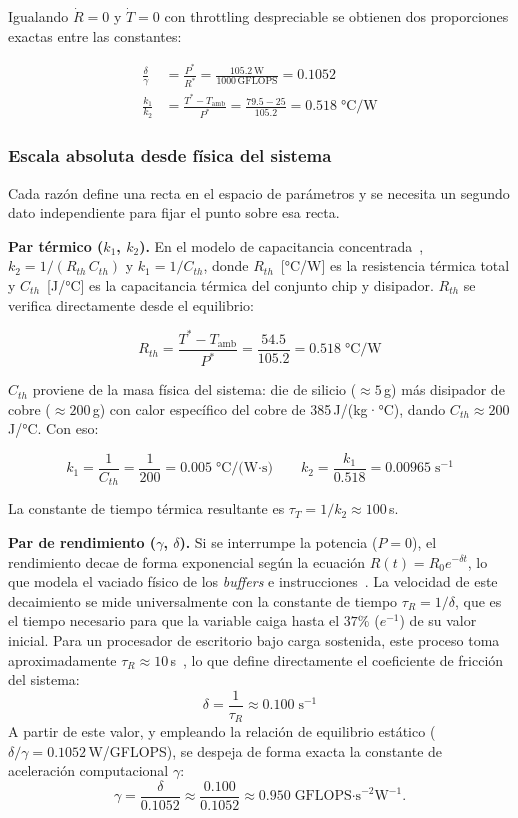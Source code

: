 \documentclass[10pt, twocolumn]{article}
\begin{document}
Igualando $\dot{R}=0$ y $\dot{T}=0$ con throttling despreciable se
obtienen dos proporciones exactas entre las constantes:
 
\begin{align}
  \frac{\delta}{\gamma} &= \frac{P^*}{R^*}
    = \frac{105.2\,\text{W}}{1000\,\text{GFLOPS}} = 0.1052
    \label{eq:ratio_dg} \\[4pt]
  \frac{k_1}{k_2} &= \frac{T^*-T_\text{amb}}{P^*}
    = \frac{79.5-25}{105.2} = 0.518\;\text{°C/W}
    \label{eq:ratio_k}
\end{align}
 
 
\subsubsection*{Escala absoluta desde física del sistema}
 
Cada razón define una recta en el espacio de parámetros y se necesita
un segundo dato independiente para fijar el punto sobre esa recta.
 
\medskip\noindent\textbf{Par térmico ($k_1$, $k_2$).}
En el modelo de capacitancia concentrada~\cite{incropera},
$k_2 = 1/(R_{th}\,C_{th})$ y $k_1 = 1/C_{th}$, donde
$R_{th}$~[°C/W] es la resistencia térmica total
y $C_{th}$~[J/°C] es la capacitancia térmica del conjunto chip y disipador.
$R_{th}$ se verifica directamente desde el equilibrio:
 
\[
  R_{th} = \frac{T^* - T_\text{amb}}{P^*} = \frac{54.5}{105.2}
         = 0.518\;\text{°C/W}
\]
 
$C_{th}$ proviene de la masa física del sistema: die de silicio
(${\approx}5$\,g) más disipador de cobre (${\approx}200$\,g) con
calor específico del cobre de 385\,J/(kg·°C), dando
$C_{th} \approx 200$\,J/°C. Con eso:
 
\[
  k_1 = \frac{1}{C_{th}} = \frac{1}{200} = 0.005\;\text{°C/(W·s)}
  \qquad
  k_2 = \frac{k_1}{0.518} = 0.00965\;\text{s}^{-1}
\]
 
La constante de tiempo térmica resultante es
$\tau_T = 1/k_2 \approx 100$\,s.
 
\medskip\noindent\textbf{Par de rendimiento ($\gamma$, $\delta$).} 
Si se interrumpe la potencia ($P=0$), el rendimiento decae de forma exponencial según la ecuación $R(t) = R_0 e^{-\delta t}$, lo que modela el vaciado físico de los \textit{buffers} e instrucciones~\cite{brooks}. La velocidad de este decaimiento se mide universalmente con la constante de tiempo $\tau_R = 1/\delta$, que es el tiempo necesario para que la variable caiga hasta el $37\%$ ($e^{-1}$) de su valor inicial. Para un procesador de escritorio bajo carga sostenida, este proceso toma aproximadamente $\tau_R \approx 10$\,s~\cite{brooks}, lo que define directamente el coeficiente de fricción del sistema:
\[
\delta = \frac{1}{\tau_R} \approx 0.100\;\text{s}^{-1}
\]
A partir de este valor, y empleando la relación de equilibrio estático ($\delta/\gamma = 0.1052$\,W/GFLOPS), se despeja de forma exacta la constante de aceleración computacional $\gamma$:
\[
\gamma = \frac{\delta}{0.1052} \approx \frac{0.100}{0.1052} \approx 0.950\;\text{GFLOPS·s}^{-2}\text{W}^{-1}.
\]
\end{document}
